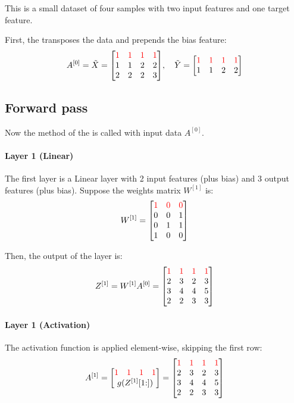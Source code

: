 This is a small dataset of four samples with two input features and one target feature.

First, the  transposes the data and prepends the bias feature:
\begin{equation*}
    A^{[0]} = \tilde{X} = \mqty[
        \color{red} 1 & \color{red} 1 & \color{red} 1 & \color{red} 1 \\
        1 & 1 & 2 & 2 \\
        2 & 2 & 2 & 3
    ], \quad \tilde{Y} = \mqty[
        \color{red} 1 & \color{red} 1 & \color{red} 1 & \color{red} 1 \\
        1 & 1 & 2 & 2
    ]
\end{equation*}

\newpage
\subsection{Forward pass}
Now the  method of the  is called with input data $A^{[0]}$.

\paragraph{Layer 1 (Linear)} The first layer is a Linear layer with 2 input features (plus bias) and 3 output features (plus bias). Suppose the weights matrix $W^{[1]}$ is:
\begin{equation*}
    W^{[1]} = \mqty[
        \color{red} 1 & \color{red} 0 & \color{red} 0 \\
        0 & 0 & 1 \\
        0 & 1 & 1 \\
        1 & 0 & 0
    ]
\end{equation*}

Then, the output of the layer is:
\begin{equation*}
    Z^{[1]} = W^{[1]} A^{[0]} = \mqty[
        \color{red} 1 & \color{red} 1 & \color{red} 1 & \color{red} 1 \\
        2 & 3 & 2 & 3 \\
        3 & 4 & 4 & 5 \\
        2 & 2 & 3 & 3
    ]
\end{equation*}

\paragraph{Layer 1 (Activation)} The activation function is applied element-wise, skipping the first row:
\begin{equation*}
    A^{[1]} = \mqty[
        \mqty{\color{red} 1 & \color{red} 1 & \color{red} 1 & \color{red} 1} \\
        g(Z^{[1]}[1\hspace{-0.6ex}:])
    ] = \mqty[
        \color{red} 1 & \color{red} 1 & \color{red} 1 & \color{red} 1 \\
        2 & 3 & 2 & 3 \\
        3 & 4 & 4 & 5 \\
        2 & 2 & 3 & 3
    ]
\end{equation*}


